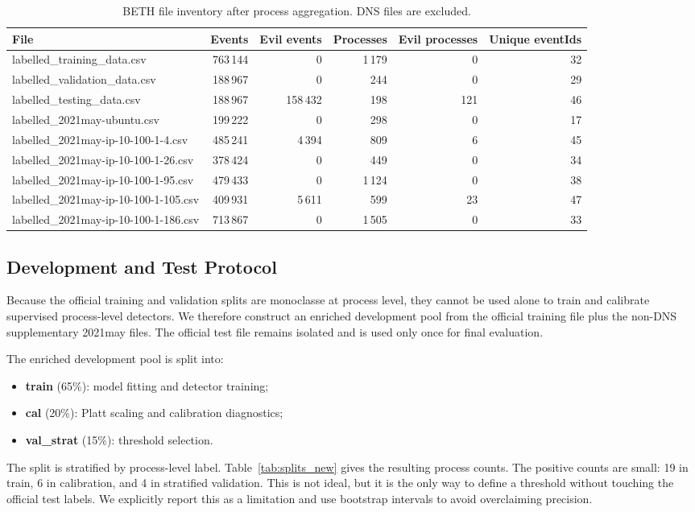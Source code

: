 \documentclass[10pt,journal,compsoc]{IEEEtran}
\begin{document}
\begin{table}[t]
\centering
\caption{BETH file inventory after process aggregation. DNS files are excluded.}
\label{tab:file_inventory}
\begin{tabular}{lrrrrr}
\toprule
\textbf{File} & \textbf{Events} & \textbf{Evil events} & \textbf{Processes} & \textbf{Evil processes} & \textbf{Unique eventIds} \\
\midrule
labelled\_training\_data.csv & 763\,144 & 0 & 1\,179 & 0 & 32 \\
labelled\_validation\_data.csv & 188\,967 & 0 & 244 & 0 & 29 \\
labelled\_testing\_data.csv & 188\,967 & 158\,432 & 198 & 121 & 46 \\
labelled\_2021may-ubuntu.csv & 199\,222 & 0 & 298 & 0 & 17 \\
labelled\_2021may-ip-10-100-1-4.csv & 485\,241 & 4\,394 & 809 & 6 & 45 \\
labelled\_2021may-ip-10-100-1-26.csv & 378\,424 & 0 & 449 & 0 & 34 \\
labelled\_2021may-ip-10-100-1-95.csv & 479\,433 & 0 & 1\,124 & 0 & 38 \\
labelled\_2021may-ip-10-100-1-105.csv & 409\,931 & 5\,611 & 599 & 23 & 47 \\
labelled\_2021may-ip-10-100-1-186.csv & 713\,867 & 0 & 1\,505 & 0 & 33 \\
\bottomrule
\end{tabular}
\end{table}

\subsection{Development and Test Protocol}

Because the official training and validation splits are monoclasse at process level, they cannot be used alone to train and calibrate supervised process-level detectors. We therefore construct an enriched development pool from the official training file plus the non-DNS supplementary 2021may files. The official test file remains isolated and is used only once for final evaluation.

The enriched development pool is split into:
\begin{itemize}
    \item \textbf{train} (65\%): model fitting and detector training;
    \item \textbf{cal} (20\%): Platt scaling and calibration diagnostics;
    \item \textbf{val\_strat} (15\%): threshold selection.
\end{itemize}
The split is stratified by process-level label. Table~\ref{tab:splits_new} gives the resulting process counts. The positive counts are small: 19 in train, 6 in calibration, and 4 in stratified validation. This is not ideal, but it is the only way to define a threshold without touching the official test labels. We explicitly report this as a limitation and use bootstrap intervals to avoid overclaiming precision.
\end{document}

